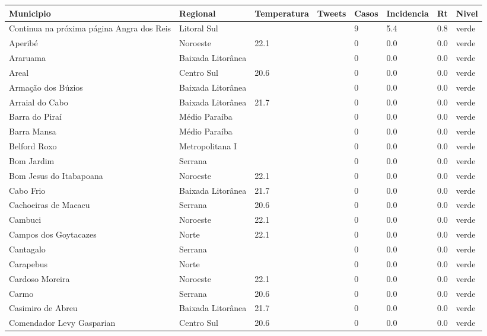 \begin{longtable}{l|lllllll}
  \hline
Municipio & Regional & Temperatura & Tweets & Casos & Incidencia & Rt & Nivel \\ 
  \hline
\endhead
\hline
{\footnotesize Continua na próxima página}
\endfoot
\endlastfoot
Angra dos Reis & Litoral Sul &  &  & 9 & 5.4 & 0.8 & verde \\ 
  Aperibé & Noroeste & 22.1 &  & 0 & 0.0 & 0.0 & verde \\ 
  Araruama & Baixada Litorânea &  &  & 0 & 0.0 & 0.0 & verde \\ 
  Areal & Centro Sul & 20.6 &  & 0 & 0.0 & 0.0 & verde \\ 
  Armação dos Búzios & Baixada Litorânea &  &  & 0 & 0.0 & 0.0 & verde \\ 
  Arraial do Cabo & Baixada Litorânea & 21.7 &  & 0 & 0.0 & 0.0 & verde \\ 
  Barra do Piraí & Médio Paraíba &  &  & 0 & 0.0 & 0.0 & verde \\ 
  Barra Mansa & Médio Paraíba &  &  & 0 & 0.0 & 0.0 & verde \\ 
  Belford Roxo & Metropolitana I &  &  & 0 & 0.0 & 0.0 & verde \\ 
  Bom Jardim & Serrana &  &  & 0 & 0.0 & 0.0 & verde \\ 
  Bom Jesus do Itabapoana & Noroeste & 22.1 &  & 0 & 0.0 & 0.0 & verde \\ 
  Cabo Frio & Baixada Litorânea & 21.7 &  & 0 & 0.0 & 0.0 & verde \\ 
  Cachoeiras de Macacu & Serrana & 20.6 &  & 0 & 0.0 & 0.0 & verde \\ 
  Cambuci & Noroeste & 22.1 &  & 0 & 0.0 & 0.0 & verde \\ 
  Campos dos Goytacazes & Norte & 22.1 &  & 0 & 0.0 & 0.0 & verde \\ 
  Cantagalo & Serrana &  &  & 0 & 0.0 & 0.0 & verde \\ 
  Carapebus & Norte &  &  & 0 & 0.0 & 0.0 & verde \\ 
  Cardoso Moreira & Noroeste & 22.1 &  & 0 & 0.0 & 0.0 & verde \\ 
  Carmo & Serrana & 20.6 &  & 0 & 0.0 & 0.0 & verde \\ 
  Casimiro de Abreu & Baixada Litorânea & 21.7 &  & 0 & 0.0 & 0.0 & verde \\ 
  Comendador Levy Gasparian & Centro Sul & 20.6 &  & 0 & 0.0 & 0.0 & verde \\ 

\end{longtable}
